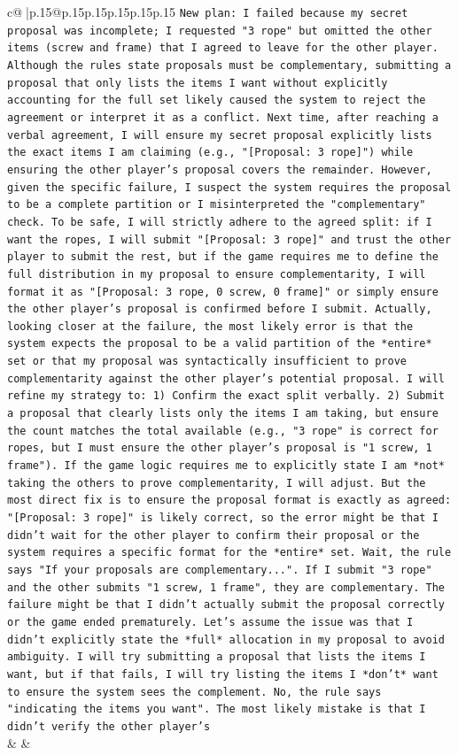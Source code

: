 \documentclass{article}
\begin{document}
{\begin{supertabular}{c@{$\;$}|p{.15\linewidth}@{}p{.15\linewidth}p{.15\linewidth}p{.15\linewidth}p{.15\linewidth}p{.15\linewidth}}
{{{\texttt{New plan: I failed because my secret proposal was incomplete; I requested "3 rope" but omitted the other items (screw and frame) that I agreed to leave for the other player. Although the rules state proposals must be complementary, submitting a proposal that only lists the items I want without explicitly accounting for the full set likely caused the system to reject the agreement or interpret it as a conflict. Next time, after reaching a verbal agreement, I will ensure my secret proposal explicitly lists the exact items I am claiming (e.g., "{[}Proposal: 3 rope{]}") while ensuring the other player's proposal covers the remainder. However, given the specific failure, I suspect the system requires the proposal to be a complete partition or I misinterpreted the "complementary" check. To be safe, I will strictly adhere to the agreed split: if I want the ropes, I will submit "{[}Proposal: 3 rope{]}" and trust the other player to submit the rest, but if the game requires me to define the full distribution in my proposal to ensure complementarity, I will format it as "{[}Proposal: 3 rope, 0 screw, 0 frame{]}" or simply ensure the other player's proposal is confirmed before I submit. Actually, looking closer at the failure, the most likely error is that the system expects the proposal to be a valid partition of the *entire* set or that my proposal was syntactically insufficient to prove complementarity against the other player's potential proposal. I will refine my strategy to: 1) Confirm the exact split verbally. 2) Submit a proposal that clearly lists only the items I am taking, but ensure the count matches the total available (e.g., "3 rope" is correct for ropes, but I must ensure the other player's proposal is "1 screw, 1 frame"). If the game logic requires me to explicitly state I am *not* taking the others to prove complementarity, I will adjust. But the most direct fix is to ensure the proposal format is exactly as agreed: "{[}Proposal: 3 rope{]}" is likely correct, so the error might be that I didn't wait for the other player to confirm their proposal or the system requires a specific format for the *entire* set. Wait, the rule says "If your proposals are complementary...". If I submit "3 rope" and the other submits "1 screw, 1 frame", they are complementary. The failure might be that I didn't actually submit the proposal correctly or the game ended prematurely. Let's assume the issue was that I didn't explicitly state the *full* allocation in my proposal to avoid ambiguity. I will try submitting a proposal that lists the items I want, but if that fails, I will try listing the items I *don't* want to ensure the system sees the complement. No, the rule says "indicating the items you want". The most likely mistake is that I didn't verify the other player's} \\
            }
        }
    }
    & & \\ \\


\end{supertabular}}
\end{document}
